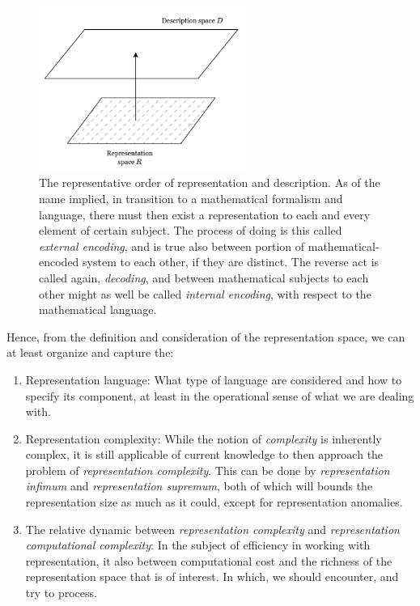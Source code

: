 \begin{figure}[h!]
    \centering
    \includegraphics[width=0.6\textwidth]{img/representation_description_scheme.png}
    \caption{The representative order of representation and description. As of the name implied, in transition to a mathematical formalism and language, there must then exist a representation to each and every element of certain subject. The process of doing is this called \textit{external encoding}, and is true also between portion of mathematical-encoded system to each other, if they are distinct. The reverse act is called again, \textit{decoding}, and between mathematical subjects to each other might as well be called \textit{internal encoding}, with respect to the mathematical language.}
\end{figure}

Hence, from the definition and consideration of the representation space, we can at least organize and capture the: 

\begin{enumerate}[topsep=1pt,itemsep=0.5pt]
    \item Representation language: What type of language are considered and how to specify its component, at least in the operational sense of what we are dealing with. 
    \item Representation complexity: While the notion of \textit{complexity} is inherently complex, it is still applicable of current knowledge to then approach the problem of \textit{representation complexity}. This can be done by \textit{representation infimum} and \textit{representation supremum}, both of which will bounds the representation size as much as it could, except for representation anomalies. 
    \item The relative dynamic between \textit{representation complexity} and \textit{representation computational complexity}: In the subject of efficiency in working with representation, it also between computational cost and the richness of the representation space that is of interest. In which, we should encounter, and try to process. 
\end{enumerate}

